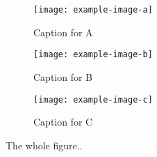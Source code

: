 \documentclass{article}
\begin{document}
    \begin{figure}
        \centering
        \begin{minipage}{0.3\linewidth}
        \begin{subfigure}{\linewidth}
        \texttt{[image: example-image-a]}
        \caption{Caption for A}
        \end{subfigure}
        \begin{subfigure}{\textwidth}
        \texttt{[image: example-image-b]}
        \caption{Caption for B}
        \end{subfigure}
        \end{minipage}
        \hfil
        \begin{minipage}{0.65\linewidth}
        \begin{subfigure}{\linewidth}
        \texttt{[image: example-image-c]}
        \caption{Caption for C}
        \end{subfigure}
        \end{minipage}
    \caption{The whole figure..}
    \end{figure}
\end{document}
